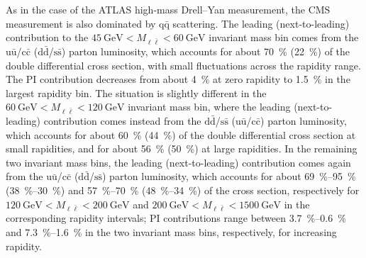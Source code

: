 As in the case of the ATLAS high-mass Drell--Yan measurement, the CMS
measurement is also dominated by $\mathrm{q}\bar{\mathrm{q}}$ scattering. The leading
(next-to-leading) contribution to the $\SI{45}{\giga\electronvolt}<M_{\ell\bar\ell}<\SI{60}{\giga\electronvolt}$ invariant
mass bin comes from
the $\mathrm{u}\bar{\mathrm{u}}$/$\mathrm{c}\bar{\mathrm{c}}$ ($\mathrm{d}\bar{\mathrm{d}}$/$\mathrm{s}\bar{\mathrm{s}}$) parton luminosity, which accounts for about \SI{70}{\percent}
(\SI{22}{\percent}) of the double differential cross section, with small fluctuations across
the rapidity range. The PI contribution decreases from about \SI{4}{\percent} at zero
rapidity to \SI{1.5}{\percent} in the largest rapidity bin. The situation is slightly
different in the $\SI{60}{\giga\electronvolt}<M_{\ell\bar\ell}<\SI{120}{\giga\electronvolt}$ invariant mass bin, where the
leading (next-to-leading) contribution comes instead from the $\mathrm{d}\bar{\mathrm{d}}$/$\mathrm{s}\bar{\mathrm{s}}$
($\mathrm{u}\bar{\mathrm{u}}$/$\mathrm{c}\bar{\mathrm{c}}$) parton luminosity, which accounts for about \SI{60}{\percent} (\SI{44}{\percent}) of the
double differential cross section at small rapidities, and for about \SI{56}{\percent} (\SI{50}{\percent})
at large rapidities. In the remaining two invariant mass bins, the leading
(next-to-leading) contribution comes again from the $\mathrm{u}\bar{\mathrm{u}}$/$\mathrm{c}\bar{\mathrm{c}}$ ($\mathrm{d}\bar{\mathrm{d}}$/$\mathrm{s}\bar{\mathrm{s}}$)
parton luminosity, which accounts for about \SIrange{69}{95}{\percent} (\SIrange{38}{30}{\percent}) and
\SIrange{57}{70}{\percent} (\SIrange{48}{34}{\percent}) of the cross section, respectively for
$\SI{120}{\giga\electronvolt}<M_{\ell\bar\ell}<\SI{200}{\giga\electronvolt}$ and $\SI{200}{\giga\electronvolt}<M_{\ell\bar\ell}<\SI{1500}{\giga\electronvolt}$ in the
corresponding rapidity intervals; PI contributions range between \SIrange{3.7}{0.6}{\percent}
and \SIrange{7.3}{1.6}{\percent} in the two invariant mass bins, respectively, for increasing
rapidity.

